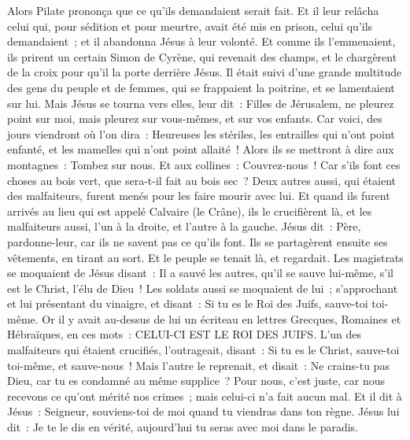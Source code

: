 \begin{multicols}{2}
Alors Pilate prononça que ce qu'ils demandaient serait fait.
Et il leur relâcha celui qui, pour sédition et pour meurtre, avait été mis en prison, celui qu'ils demandaient~; et il abandonna Jésus à leur volonté.
Et comme ils l'emmenaient, ils prirent un certain Simon de Cyrène, qui revenait des champs, et le chargèrent de la croix pour qu'il la porte derrière Jésus.
Il était suivi d'une grande multitude des gens du peuple et de femmes, qui se frappaient la poitrine, et se lamentaient sur lui.
Mais Jésus se tourna vers elles, leur dit~: Filles de Jérusalem, ne pleurez point sur moi, mais pleurez sur vous-mêmes, et sur vos enfants.
Car voici, des jours viendront où l'on dira~: Heureuses les stériles, les entrailles qui n'ont point enfanté, et les mamelles qui n'ont point allaité~!
Alors ils se mettront à dire aux montagnes~: Tombez sur nous. Et aux collines~: Couvrez-nous~!
Car s'ils font ces choses au bois vert, que sera-t-il fait au bois sec~?
Deux autres aussi, qui étaient des malfaiteurs, furent menés pour les faire mourir avec lui.
Et quand ils furent arrivés au lieu qui est appelé Calvaire (le Crâne), ils le crucifièrent là, et les malfaiteurs aussi, l'un à la droite, et l'autre à la gauche.
Jésus dit~: Père, pardonne-leur, car ils ne savent pas ce qu'ils font. Ils se partagèrent ensuite ses vêtements, en tirant au sort.
Et le peuple se tenait là, et regardait. Les magistrats se moquaient de Jésus disant~: Il a sauvé les autres, qu'il se sauve lui-même, s'il est le Christ, l'élu de Dieu~!
Les soldats aussi se moquaient de lui~; s'approchant et lui présentant du vinaigre,
et disant~: Si tu es le Roi des Juifs, sauve-toi toi-même.
Or il y avait au-dessus de lui un écriteau en lettres Grecques, Romaines et Hébraïques, en ces mots~: CELUI-CI EST LE ROI DES JUIFS.
L'un des malfaiteurs qui étaient crucifiés, l'outrageait, disant~: Si tu es le Christ, sauve-toi toi-même, et sauve-nous~!
Mais l'autre le reprenait, et disait~: Ne crains-tu pas Dieu, car tu es condamné au même supplice~?
Pour nous, c'est juste, car nous recevons ce qu'ont mérité nos crimes~; mais celui-ci n'a fait aucun mal.
Et il dit à Jésus~: Seigneur, souviens-toi de moi quand tu viendras dans ton règne.
Jésus lui dit~: Je te le dis en vérité, aujourd'hui tu seras avec moi dans le paradis.

\end{multicols}
